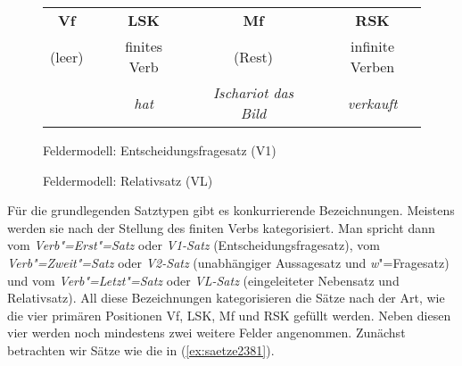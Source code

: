 \begin{figure}
    \begin{tabular}{cp{0.1em}cp{0.1em}cp{0.1em}c}
      \textbf{Vf} && \textbf{LSK} && \textbf{Mf} && \textbf{RSK} \\
      \cmidrule{1-1}\cmidrule{3-3}\cmidrule{5-5}\cmidrule{7-7}
	(leer) && finites Verb && (Rest) && infinite Verben \\
	&& \textit{hat} && \textit{Ischariot das Bild} && \textit{verkauft} \\
    \end{tabular}
  \caption{Feldermodell: Entscheidungsfragesatz (V1)}
  \label{fig:feldertypen3}
\end{figure}

\begin{figure}
  \caption{Feldermodell: Relativsatz (VL)}
  \label{fig:feldertypen4}
\end{figure}


Für die grundlegenden Satztypen gibt es konkurrierende Bezeichnungen.
Meistens werden sie nach der Stellung des finiten Verbs kategorisiert.
Man spricht dann vom \textit{Verb"=Erst"=Satz} oder \textit{V1-Satz} (Entscheidungsfragesatz), vom \textit{Verb"=Zweit"=Satz} oder \textit{V2-Satz} (unabhängiger Aussagesatz und \textit{w}"=Fragesatz) und vom \textit{Verb"=Letzt"=Satz} oder \textit{VL-Satz} (eingeleiteter Nebensatz und Relativsatz).
All diese Bezeichnungen kategorisieren die Sätze nach der Art, wie die vier primären Positionen Vf, LSK, Mf und RSK gefüllt werden.
Neben diesen vier werden noch mindestens zwei weitere Felder angenommen.
Zunächst betrachten wir Sätze wie die in (\ref{ex:saetze2381}).

\begin{exe}
  \ex\label{ex:saetze2381}
  \begin{xlist}
  \end{xlist}
\end{exe}

